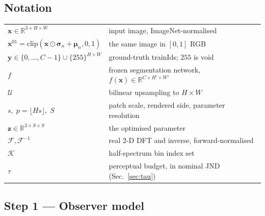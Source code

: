 %
%
%

\subsection{Notation}

\begin{tabular}{ll}
$\mathbf{x}\in\mathbb{R}^{3\times H\times W}$ & input image, ImageNet-normalised \\
$\mathbf{x}^{01}=\mathrm{clip}(\mathbf{x}\odot\boldsymbol{\sigma}_n+\boldsymbol{\mu}_n,0,1)$ & the same image in $[0,1]$ RGB \\
$\mathbf{y}\in\{0,\dots,C-1\}\cup\{255\}^{H\times W}$ & ground-truth trainIds; $255$ is void \\
$f$ & frozen segmentation network, $f(\mathbf{x})\in\mathbb{R}^{C\times H'\times W'}$ \\
$\mathcal{U}$ & bilinear upsampling to $H\times W$ \\
$s,\; p=\lfloor Hs\rfloor,\; S$ & patch scale, rendered side, parameter resolution \\
$\mathbf{z}\in\mathbb{R}^{3\times S\times S}$ & the optimised parameter \\
$\mathcal{F},\mathcal{F}^{-1}$ & real 2-D DFT and inverse, forward-normalised \\
$\mathcal{K}$ & half-spectrum bin index set \\
$\tau$ & perceptual budget, in nominal JND (Sec.~\ref{sec:tau}) \\
\end{tabular}

\subsection{Step 1 — Observer model}

